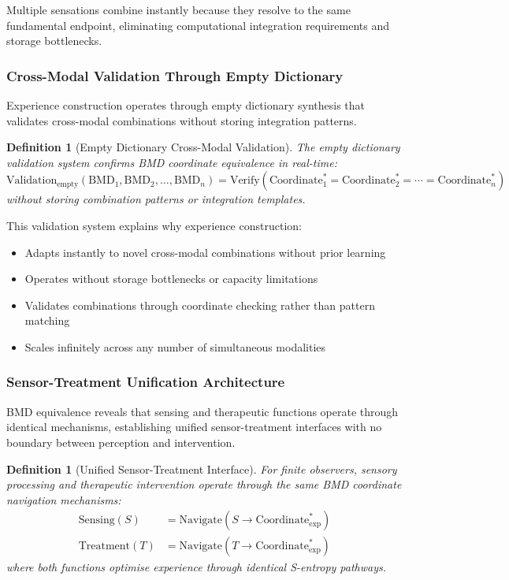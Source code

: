 \documentclass{article}
\newtheorem{definition}[theorem]{Definition}
\begin{document}
Multiple sensations combine instantly because they resolve to the same fundamental endpoint, eliminating computational integration requirements and storage bottlenecks.

\subsubsection{Cross-Modal Validation Through Empty Dictionary}

Experience construction operates through empty dictionary synthesis that validates cross-modal combinations without storing integration patterns.

\begin{definition}[Empty Dictionary Cross-Modal Validation]
The empty dictionary validation system confirms BMD coordinate equivalence in real-time:
\begin{equation}
\text{Validation}_{\text{empty}}(\text{BMD}_1, \text{BMD}_2, \ldots, \text{BMD}_n) = \text{Verify}(\text{Coordinate}_1^* = \text{Coordinate}_2^* = \cdots = \text{Coordinate}_n^*)
\end{equation}
without storing combination patterns or integration templates.
\end{definition}

This validation system explains why experience construction:
\begin{itemize}
\item Adapts instantly to novel cross-modal combinations without prior learning
\item Operates without storage bottlenecks or capacity limitations
\item Validates combinations through coordinate checking rather than pattern matching
\item Scales infinitely across any number of simultaneous modalities
\end{itemize}

\subsubsection{Sensor-Treatment Unification Architecture}

BMD equivalence reveals that sensing and therapeutic functions operate through identical mechanisms, establishing unified sensor-treatment interfaces with no boundary between perception and intervention.

\begin{definition}[Unified Sensor-Treatment Interface]
For finite observers, sensory processing and therapeutic intervention operate through the same BMD coordinate navigation mechanisms:
\begin{align}
\text{Sensing}(S) &= \text{Navigate}(S \rightarrow \text{Coordinate}_{\text{exp}}^*) \\
\text{Treatment}(T) &= \text{Navigate}(T \rightarrow \text{Coordinate}_{\text{exp}}^*)
\end{align}
where both functions optimise experience through identical S-entropy pathways.
\end{definition}
\end{document}
